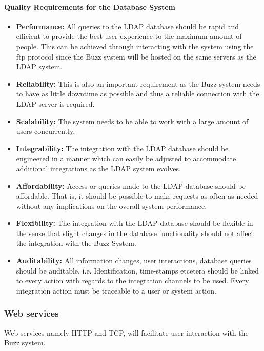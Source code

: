 \documentclass[a4paper,12pt]{report}
\begin{document}
	\paragraph{Quality Requirements for the Database System}
	\begin{itemize}
	\item{\textbf{Performance:} All queries to the LDAP database should be rapid and efficient to provide the best user experience to the maximum amount of people. This can be achieved through interacting with the system using the ftp protocol since the Buzz system will be hosted on the same servers as the LDAP system.}
	\item{\textbf{Reliability:} This is also an important requirement as the Buzz system needs to have as little downtime as possible and thus a reliable connection with the LDAP server is required. }
	\item{\textbf{Scalability:} The system needs to be able to work with a large amount of users concurrently.}
	\item{\textbf{Integrability:} The integration with the LDAP database should be engineered in a manner which can easily be adjusted to accommodate additional integrations as the LDAP system evolves.}
	\item{\textbf{Affordability:} Access or queries made to the LDAP database should be affordable. That is, it should be possible to make requests as often as needed without any implications on the overall system performance.}
	\item{\textbf{Flexibility:} The integration with the LDAP database should be flexible in the sense that slight changes in the database functionality should not affect the integration with the Buzz System.}
	\item{\textbf{Auditability:} All information changes, user interactions, database queries should be auditable. i.e. Identification, time-stamps etcetera should be linked to every action with regards to the integration channels to be used. Every integration action must be traceable to a user or system action.}
	\end{itemize}

  \subsubsection{Web services}
  Web services namely HTTP and TCP, will facilitate user interaction with the Buzz system. 
\end{document}
